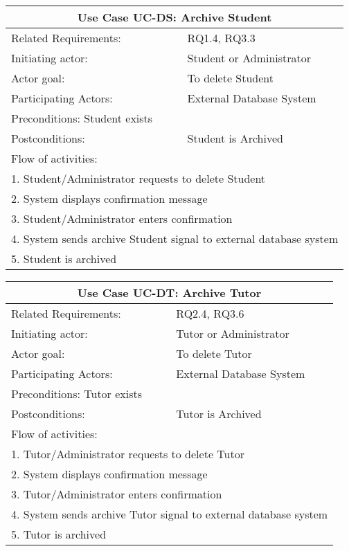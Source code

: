 \documentclass[11pt,a4paper]{article}
\begin{document}
{		\begin{tabular}{| l | p{10cm}| }
			\hline\multicolumn{2}{|c|}{ \textbf{Use Case UC-DS: Archive Student}} \\ \hline
			Related Requirements: & RQ1.4, RQ3.3 \\ \hline
			Initiating actor: & Student or Administrator \\ \hline
			Actor goal: & To delete Student\\ \hline
			Participating Actors: & External Database System\\ \hline
			Preconditions: Student exists\\ \hline
			Postconditions: & Student is Archived\\ \hline
			\multicolumn{2}{|l|}{Flow of activities:}\\ \hline
			\multicolumn{2}{|p{15cm}|}{1. Student/Administrator requests to delete Student}\\
			\multicolumn{2}{|p{15cm}|}{2. System displays confirmation message}\\
			\multicolumn{2}{|p{15cm}|}{3. Student/Administrator enters confirmation}	\\		
			\multicolumn{2}{|p{15cm}|}{4. System sends archive Student signal to external database system}\\
			\multicolumn{2}{|l|}{5. Student is archived}	
			\\ \hline		
		\end{tabular}
		
		\begin{tabular}{| l | p{10cm}| }
			\hline\multicolumn{2}{|c|}{ \textbf{Use Case UC-DT: Archive Tutor}} \\ \hline
			Related Requirements: & RQ2.4, RQ3.6 \\ \hline
			Initiating actor: & Tutor or Administrator \\ \hline
			Actor goal: & To delete Tutor\\ \hline
			Participating Actors: & External Database System\\ \hline
			Preconditions: Tutor exists\\ \hline
			Postconditions: & Tutor is Archived\\ \hline
			\multicolumn{2}{|l|}{Flow of activities:}\\ \hline
			\multicolumn{2}{|p{15cm}|}{1. Tutor/Administrator requests to delete Tutor}\\
			\multicolumn{2}{|p{15cm}|}{2. System displays confirmation message}\\
			\multicolumn{2}{|p{15cm}|}{3. Tutor/Administrator enters confirmation}	\\		
			\multicolumn{2}{|p{15cm}|}{4. System sends archive Tutor signal to external database system}\\
			\multicolumn{2}{|l|}{5. Tutor is archived}	
			\\ \hline		
		\end{tabular}		
		
		}
		
\end{document}
